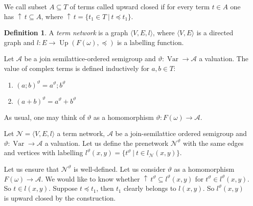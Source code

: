 \documentclass[a4paper]{article}
\theoremstyle{definition}
\newtheorem{definition}{Definition}
\theoremstyle{theorem}
\theoremstyle{proposition}
\theoremstyle{lemma}
\theoremstyle{ex}
\theoremstyle{corollary}
\theoremstyle{claim}
\newcommand{\up}[1]{\ensuremath{{\uparrow}\,#1}}
\begin{document}
We call subset $A \subseteq T$ of terms called upward closed if for every term
$t \in A$ one has $\up{t} \subseteq A$, where $\up{t} = \{ t_1 \in T \: | \: t \preceq t_1 \}$.

\begin{definition}
  A \emph{term network} is a graph $\langle V, E, l \rangle$, where $\langle V, E \rangle$ is a directed graph and $l : E \to \operatorname{Up}(F(\omega), \preceq)$ is a labelling function.
\end{definition}

Let $\mathcal{A}$ be a join semilattice-ordered semigroup and $\vartheta : \operatorname{Var} \to \mathcal{A}$ a valuation. The value of complex terms is defined inductively for $a, b \in T$:

\begin{enumerate}
  \item $(a ; b)^{\vartheta} = a^{\vartheta} ; b^{\vartheta}$
  \item $(a + b)^{\vartheta} = a^{\vartheta} + b^{\vartheta}$
\end{enumerate}

As usual, one may think of $\vartheta$ as a homomorphism $\vartheta : F(\omega) \to \mathcal{A}$.

Let $\mathcal{N} = \langle V, E, l \rangle$ a term network, $\mathcal{A}$ be a join-semilattice ordered semigroup and $\vartheta : \operatorname{Var} \to {\mathcal{A}}$ a valuation. Let us define the prenetwork $\mathcal{N}^{\vartheta}$ with the same edges and vertices with labelling $l^{\vartheta}(x, y) = \{ t^{\vartheta} \: | \: t \in l_{\mathcal{N}}(x, y)\}$.

Let us ensure that $\mathcal{N}^{\vartheta}$ is well-defined. Let us consider $\vartheta$ as a homomorphism $F(\omega) \to \mathcal{A}$. We would like to know whether $\up{t^{\vartheta}} \subseteq l^{\vartheta}(x,y)$ for $t^{\vartheta} \in l^{\vartheta}(x,y)$. So $t \in l(x,y)$. Suppose $t \preceq t_1$, then $t_1$ clearly belongs to $l(x,y)$.
So $l^{\vartheta}(x,y)$ is upward closed by the construction.
\end{document}
